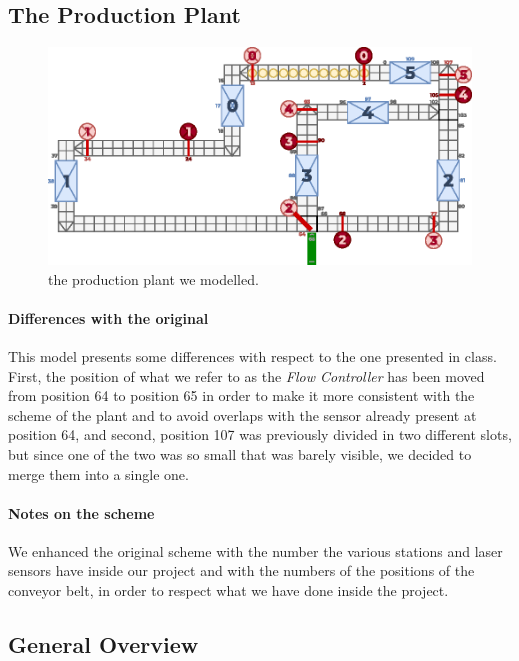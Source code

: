 \documentclass[a4paper]{article}
\begin{document}
    \subsection{The Production Plant}

    \begin{figure}[h!]
        \includegraphics[width=\columnwidth]{./images/plant}
        \caption{the production plant we modelled.}
        \label{figure:scheme}
    \end{figure}

    \paragraph{Differences with the original} This model presents some differences with respect to the one presented in class. First, the position of what we refer to as the \textit{Flow Controller} has been moved from position 64 to position 65 in order to make it more consistent with the scheme of the plant and to avoid overlaps with the sensor already present at position 64, and second, position 107 was previously divided in two different slots, but since one of the two was so small that was barely visible, we decided to merge them into a single one.

    \paragraph{Notes on the scheme} We enhanced the original scheme with the number the various stations and laser sensors have inside our project and with the numbers of the positions of the conveyor belt, in order to respect what we have done inside the project.

    \subsection{General Overview}
\end{document}
